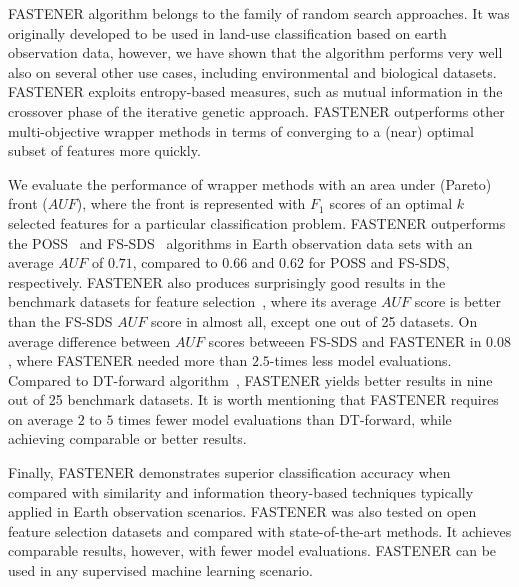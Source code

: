 FASTENER algorithm belongs to the family of random search approaches.
It was originally developed to be used in land-use classification based on earth observation data, however, we have shown that the algorithm performs very well also on several other use cases, including environmental and biological datasets.
FASTENER exploits entropy-based measures, such as mutual information in the crossover phase of the iterative genetic approach. 
FASTENER outperforms other multi-objective wrapper methods in terms of converging to a (near) optimal subset of features more quickly.

We evaluate the performance of wrapper methods with an area under (Pareto) front ($AUF$), where the front is represented with $F_1$ scores of an optimal $k$ selected features for a particular classification problem.
FASTENER outperforms the POSS~\cite{qian:2015:poss} and FS-SDS~\cite{alhakbani:2017:fs-sds} algorithms in Earth observation data sets with an average $AUF$ of $0.71$, compared to $0.66$ and $0.62$ for POSS and FS-SDS, respectively.
FASTENER also produces surprisingly good results in the benchmark datasets for feature selection~\cite{li:2017:feature}, where its average $AUF$ score is better than the FS-SDS $AUF$ score in almost all, except one out of 25 datasets.
On average difference between $AUF$ scores betweeen FS-SDS and FASTENER in $0.08$, where FASTENER needed more than $2.5$-times less model evaluations.
Compared to DT-forward algorithm~\cite{guyon:2003:dt-forward}, FASTENER yields better results in nine out of 25 benchmark datasets.
It is worth mentioning that FASTENER requires on average $2$ to $5$ times fewer model evaluations than DT-forward, while achieving comparable or better results.

Finally, FASTENER demonstrates superior classification accuracy when compared with similarity and information theory-based techniques typically applied in Earth observation scenarios.
FASTENER was also tested on open feature selection datasets and compared with state-of-the-art methods. 
It achieves comparable results, however, with fewer model evaluations.
FASTENER can be used in any supervised machine learning scenario.


